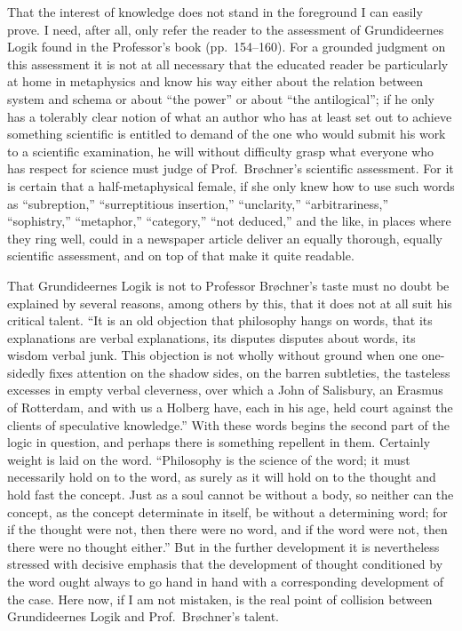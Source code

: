 \documentclass[12pt]{book}
\newcommand{\opage}[1]{\marginnote{\footnotesize\textit{[#1]}}}
\begin{document}
That the interest of knowledge does not stand in the foreground I can
easily prove. I need, after all, only refer the reader to the assessment of
Grundideernes Logik found in the Professor's book (pp.\ 154--160). For a
grounded judgment on this assessment it is not at all necessary that the
educated reader be particularly at home in metaphysics and know his way
either about the relation between system and schema or about ``the power''
or about ``the antilogical''; if he only has a tolerably clear notion of what
an author who has at least set out to achieve something scientific is
entitled to demand of the one who would submit his work to a scientific
examination, he will without difficulty grasp what everyone who has respect
for science must judge of Prof.\ Brøchner's scientific assessment. For it is
certain that a half-metaphysical female, if she only knew how to use such
words as ``subreption,'' ``surreptitious insertion,'' ``unclarity,''
``arbitrariness,'' ``sophistry,'' ``metaphor,'' ``category,'' ``not
deduced,'' and the like, in places where they ring well, could in a
newspaper article deliver an equally thorough, equally scientific
assessment, and on top of that make it quite readable.

That Grundideernes Logik is not to Professor Brøchner's taste must no doubt
be explained by several reasons, among others by this, that it does not at
all suit his critical
\opage{48}\setcounter{footnote}{0}%
talent. ``It is an old objection that philosophy hangs on words, that its
explanations are verbal explanations, its disputes disputes about words, its
wisdom verbal junk. This objection is not wholly without ground when one
one-sidedly fixes attention on the shadow sides, on the barren subtleties,
the tasteless excesses in empty verbal cleverness, over which a John of
Salisbury, an Erasmus of Rotterdam, and with us a Holberg have, each in his
age, held court against the clients of speculative knowledge.'' With these
words begins the second part of the logic in question, and perhaps there is
something repellent in them. Certainly weight is laid on the word.
``Philosophy is the science of the word; it must necessarily hold on to the
word, as surely as it will hold on to the thought and hold fast the concept.
Just as a soul cannot be without a body, so neither can the concept, as the
concept determinate in itself, be without a determining word; for if the
thought were not, then there were no word, and if the word were not, then
there were no thought either.'' But in the further development it is
nevertheless stressed with decisive emphasis that the development of thought
conditioned by the word ought always to go hand in hand with a
corresponding development of the case. Here now, if I am not mistaken, is
the real point of collision between Grundideernes Logik and Prof.\
Brøchner's talent.
\end{document}
